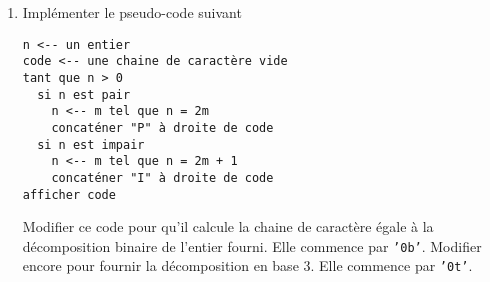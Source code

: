 \begin{enumerate}
 \item Implémenter le pseudo-code suivant
 \begin{verbatim}
n <-- un entier
code <-- une chaine de caractère vide
tant que n > 0
  si n est pair
    n <-- m tel que n = 2m
    concaténer "P" à droite de code
  si n est impair
    n <-- m tel que n = 2m + 1
    concaténer "I" à droite de code
afficher code
 \end{verbatim}
Modifier ce code pour qu'il calcule la chaine de caractère égale à la décomposition binaire de l'entier fourni. Elle commence par \texttt{'0b'}. Modifier encore pour fournir la décomposition en base 3. Elle commence par \texttt{'0t'}.

\end{enumerate}
